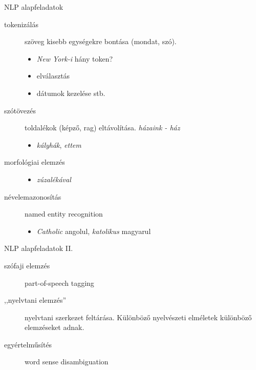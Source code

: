 \documentclass[xcolor=rgb]{beamer}
\begin{document}
\begin{frame}{NLP alapfeladatok}
    \begin{description}
            \pause
        \item[tokenizálás] szöveg kisebb egységekre bontása (mondat, szó).
            \pause
            \begin{itemize}
                \item \emph{New York-i} hány token?
                \item elválasztás
                \item dátumok kezelése stb.
            \end{itemize}
            \pause
        \item[szótövezés] toldalékok (képző, rag) eltávolítása. \emph{házaink - ház}
            \pause
            \begin{itemize}
                \item \emph{kályhák}, \emph{ettem}
            \end{itemize}
        \item[morfológiai elemzés]
            \pause
            \begin{itemize}
                \item \emph{zúzalékával}
            \end{itemize}
            \pause
        \item[névelemazonosítás] named entity recognition
            \pause
            \begin{itemize}
                \item \emph{Catholic} angolul, \emph{katolikus} magyarul
            \end{itemize}
    \end{description}
\end{frame}

\begin{frame}{NLP alapfeladatok II.}
    \pause
    \begin{description}
        \item[szófaji elemzés] part-of-speech tagging
    \pause
        \item[,,nyelvtani elemzés''] nyelvtani szerkezet feltárása. Különböző nyelvészeti elméletek különböző elemzéseket adnak.
        \pause
        \item[egyértelműsítés] word sense disambiguation
    \end{description}
\end{frame}
\end{document}
